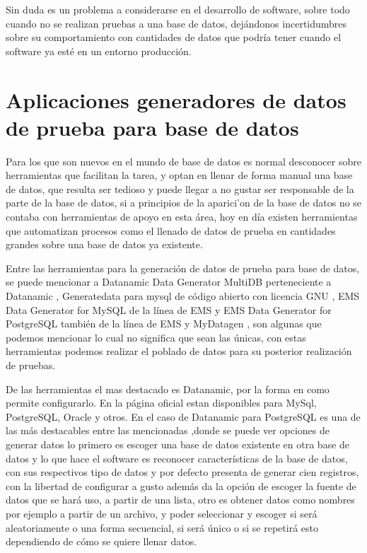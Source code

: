 Sin duda es un problema a considerarse en el desarrollo de software, sobre todo cuando no se realizan pruebas a una base de datos, dej\'andonos incertidumbres sobre su comportamiento con cantidades de datos que podr\'ia tener cuando el software ya est\'e en un entorno producci\'on.
\section{Aplicaciones generadores de datos de prueba para base de datos}
Para los que son nuevos en el mundo de base de datos es normal desconocer sobre herramientas que facilitan la tarea, y optan en llenar de forma manual una base de datos, que resulta ser tedioso y puede llegar a no gustar ser responsable de la parte de la base de datos, si a principios de la aparici'on de la base de datos no se contaba con herramientas de apoyo en esta \'area, hoy en d\'ia existen herramientas que automatizan procesos como el llenado de datos de prueba en cantidades grandes sobre una base de datos ya existente. 

Entre las herramientas para la generaci\'on de datos de prueba para base de datos, se puede mencionar a Datanamic Data Generator MultiDB perteneciente a Datanamic \cite{datanamic}, Generatedata para mysql de c\'odigo abierto con licencia GNU \cite{generatedata}, EMS Data Generator for MySQL de la l\'inea de EMS y EMS Data Generator for PostgreSQL tambi\'en de la l\'inea de EMS \cite{emsdatagenerator} y MyDatagen \cite{mydatagen}, son algunas que podemos mencionar lo cual no significa que sean las \'unicas, con estas herramientas podemos realizar el poblado de datos para su posterior realizaci\'on de pruebas.

De las herramientas el mas destacado es Datanamic, por la forma en como permite configurarlo. En la p\'agina oficial \cite{datanamic} estan disponibles para MySql, PostgreSQL, Oracle y otros. En el caso de Datanamic para PostgreSQL es una de las  m\'as destacables entre las mencionadas ,donde se puede ver opciones de generar datos lo primero es escoger una base de datos existente en otra base de datos y lo que hace el software es reconocer caracter\'isticas de la base de datos, con sus respectivos tipo de datos y por defecto presenta de generar cien registros, con la libertad de configurar a gusto adem\'as da la opci\'on de escoger la fuente de datos que se har\'a uso, a partir de una lista, otro es obtener datos como nombres por ejemplo a partir de un archivo, y poder seleccionar y escoger si ser\'a aleatoriamente o una forma secuencial, si ser\'a \'unico o si se repetir\'a esto dependiendo de c\'omo se quiere llenar datos.

